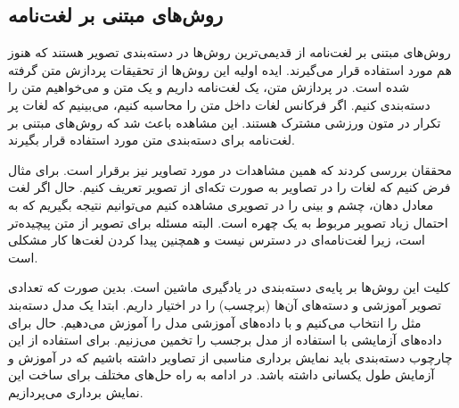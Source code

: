 \documentclass[11pt]{article}
\begin{document}
\subsection{روش‌های مبتنی بر لغت‌نامه}\label{sec:img_class:vocab_based}
روش‌های مبتنی بر لغت‌نامه از قدیمی‌ترین روش‌ها در دسته‌بندی تصویر هستند که هنوز هم مورد استفاده قرار می‌گیرند. ایده اولیه این روش‌ها از تحقیقات پردازش متن گرفته شده است. در پردازش متن، یک لغت‌نامه داریم و یک متن  و می‌خواهیم متن را دسته‌بندی کنیم. اگر فرکانس لغات داخل متن را محاسبه کنیم، می‌بینیم که لغات پر تکرار در متون ورزشی مشترک هستند. این مشاهده باعث شد که روش‌های مبتنی بر لغت‌نامه برای دسته‌بندی متن مورد استفاده قرار بگیرند.

محققان بررسی کردند که همین مشاهدات در مورد تصاویر نیز برقرار است. برای مثال فرض کنیم که لغات را در تصاویر به صورت تکه‌ای از تصویر تعریف کنیم. حال اگر لغت معادل دهان، چشم و بینی را در تصویری مشاهده کنیم می‌توانیم نتیجه بگیریم که به احتمال زیاد تصویر مربوط به یک چهره است. البته مسئله برای تصویر از متن پیچیده‌تر است، زیرا لغت‌نامه‌ای در دسترس نیست و همچنین پیدا کردن لغت‌ها کار مشکلی است.

کلیت این روش‌ها بر پایه‌ی دسته‌بندی در یادگیری ماشین است. بدین صورت که تعدادی تصویر آموزشی و دسته‌های آن‌ها (برچسب) را در اختیار داریم. ابتدا یک مدل دسته‌بند مثل
 \cite{svm}
را انتخاب می‌کنیم و با داده‌های آموزشی مدل را آموزش می‌دهیم. حال برای داده‌های آزمایشی با استفاده از مدل برجسب را تخمین می‌زنیم. برای استفاده از این چارچوب دسته‌بندی باید نمایش برداری مناسبی از تصاویر داشته باشیم که در آموزش و آزمایش طول یکسانی داشته باشد. در ادامه به راه حل‌های مختلف برای ساخت این نمایش برداری می‌پردازیم.
\end{document}
